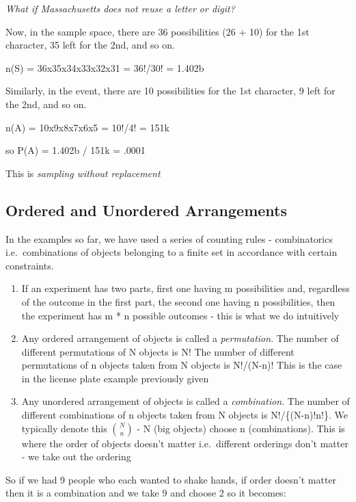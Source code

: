 \documentclass[]{book}
\theoremstyle{definition}
\theoremstyle{definition}
\theoremstyle{definition}
\theoremstyle{remark}
\begin{document}
\emph{What if Massachusetts does not reuse a letter or digit?}

Now, in the sample space, there are 36 possibilities (26 + 10) for the
1st character, 35 left for the 2nd, and so on.

n(S) = 36x35x34x33x32x31 = 36!/30! = 1.402b

Similarly, in the event, there are 10 possibilities for the 1st
character, 9 left for the 2nd, and so on.

n(A) = 10x9x8x7x6x5 = 10!/4! = 151k

so P(A) = 1.402b / 151k = .0001

This is \emph{sampling without replacement}

\subsection{Ordered and Unordered
Arrangements}\label{ordered-and-unordered-arrangements}

In the examples so far, we have used a series of counting rules -
combinatorics i.e.~combinations of objects belonging to a finite set in
accordance with certain constraints.

\begin{enumerate}
\def\labelenumi{\arabic{enumi}.}
\item
  If an experiment has two parts, first one having m possibilities and,
  regardless of the outcome in the first part, the second one having n
  possibilities, then the experiment has m * n possible outcomes - this
  is what we do intuitively
\item
  Any ordered arrangement of objects is called a \emph{permutation}. The
  number of different permutations of N objects is N! The number of
  different permutations of n objects taken from N objects is N!/(N-n)!
  This is the case in the license plate example previously given
\item
  Any unordered arrangement of objects is called a \emph{combination}.
  The number of different combinations of n objects taken from N objects
  is N!/\{(N-n)!n!\}. We typically denote this \(\binom{N}{n}\) - N (big
  objects) choose n (combinations). This is where the order of objects
  doesn't matter i.e.~different orderings don't matter - we take out the
  ordering
\end{enumerate}

So if we had 9 people who each wanted to shake hands, if order doesn't
matter then it is a combination and we take 9 and choose 2 so it
becomes:
\end{document}
